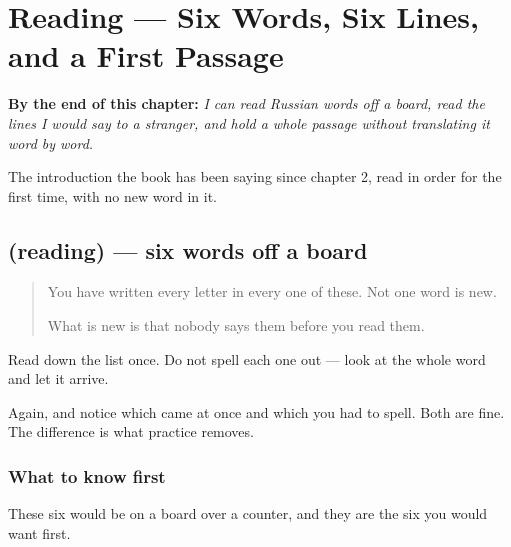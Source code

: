 
\chapter{Reading — Six Words, Six Lines, and a First Passage}
\label{ch:ru-pervoe-chtenie}

\begin{chapteropening}
\textbf{By the end of this chapter:} \emph{I can read Russian words off a board, read the lines I would say to a stranger, and hold a whole passage without translating it word by word.}

The introduction the book has been saying since chapter 2, read in order for the first time, with no new word in it.
\end{chapteropening}

\section[(reading)]{(reading) — six words off a board}

\label{lesson:RU-C27-words}



\begin{quote}
You have written every letter in every one of these. Not one word is new.

What is new is that nobody says them before you read them.
\end{quote}

\begin{tcolorbox}[breakable,skin=enhanced,colback=orange!6,colframe=orange!45!black,boxrule=0.5pt,arc=1mm,left=6pt,right=6pt,top=4pt,bottom=4pt,fonttitle=\bfseries,title={Read this}]
\begin{quote}
     
\end{quote}

Read down the list once. Do not spell each one out — look at the whole word and let it arrive.

Again, and notice which came at once and which you had to spell. Both are fine. The difference is what practice removes.
\end{tcolorbox}

\subsection*{What to know first}
These six would be on a board over a counter, and they are the six you would want first.

